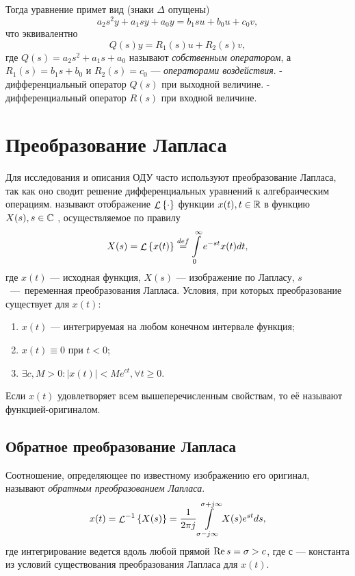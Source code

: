 \documentclass[../../TAU.tex]{subfiles}
\begin{document}
    Тогда уравнение 
     примет вид (знаки $\Delta$ опущены)
    \begin{equation}
        a_2 s^2 y + a_1 s y + a_0 y = b_1 s u + b_0 u + c_0 v,
    \end{equation}
    что эквивалентно
    \begin{equation}
        Q(s) y = R_1(s)u + R_2(s)v,
    \end{equation}
    где 
    $Q(s) = a_2s^2 + a_1 s + a_0$ 
    называют {\it собственным оператором}, а 
    $R_1(s) = b_1s+b_0$ и 
    $R_2(s) = c_0$
     --- {\it операторами воздействия}.
     - дифференциальный оператор $Q(s)$ при выходной величине.
     - дифференциальный оператор $R(s)$ при входной величине.
\section{Преобразование Лапласа} %
    Для исследования и описания ОДУ часто используют преобразование Лапласа, так как оно сводит решение дифференциальных уравнений к алгебраическим операциям.
     называют отображение 
    $\mathop{\mathcal{L}}\nolimits\left\{\cdot\right\}$ 
    функции 
    $x(t), t\in\mathbb{R}$
     в функцию 
    $X(s), s\in\mathbb{C}$
    , осуществляемое по правилу
    \begin{equation}
        X(s) = \mathop{\mathcal{L}}\nolimits\left\{x(t)\right\} \stackrel{def}{=} \int\limits_0^\infty e^{-st} x(t) dt,
    \end{equation}
    где $x(t)$ --- исходная функция, $X(s)$ --- изображение по Лапласу, $s$~---~переменная преобразования Лапласа.
    Условия, при которых преобразование существует для $x(t)$:
    \begin{enumerate}
        \item $x(t)$ --- интегрируемая на любом конечном интервале функция;
        \item $x(t)\equiv0$ при $t < 0$;
        \item $\exists c, M > 0: |x(t)| < M e^{ct}, \forall t \ge 0$.
    \end{enumerate}
    Если $x(t)$ удовлетворяет всем вышеперечисленным свойствам, то её называют функцией-оригиналом.
\subsection{Обратное преобразование Лапласа} %
    Соотношение, определяющее по известному изображению его оригинал, называют {\it обратным преобразованием Лапласа}. 
    \begin{equation}
        x(t) = {\mathop{\mathcal{L}}\nolimits^{-1}\left\{X(s)\right\}} = \frac{1}{2\pi j} \int\limits_{\sigma-j\infty}^{\sigma + j\infty} X(s)e^{st} ds,
    \end{equation}
    где интегрирование ведется вдоль любой прямой 
    $\mathop{\mathrm{Re}}\nolimits{s} = \sigma > c$, 
    где $с$ --- константа из условий существования преобразования Лапласа для $x(t)$.
\end{document}
